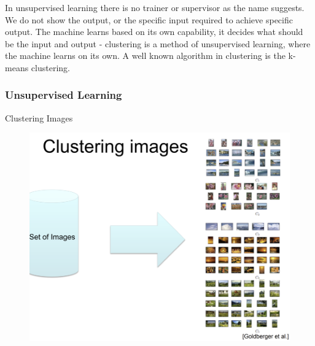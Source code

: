 \documentclass[9pt]{beamer}
\begin{document}
\begin{CJK*}{GBK}{kai}
\begin{frame}
\begin{figure}[h]
\end{figure}
In unsupervised learning there is no trainer or supervisor as the name suggests. We do not show the output, or the specific input required to achieve specific output. The machine learns based on its own capability, it decides what should be the input and output - clustering is a method of unsupervised learning, where the machine learns on its own. A well known algorithm in clustering is the k-means clustering.
\end{frame}
\begin{frame}
	\frametitle{Unsupervised Learning}
	\begin{block}{Clustering Images}	
		\begin{figure}[h]
			\centering
			\includegraphics[scale=0.3]{ClusteringImg.png}		
		\end{figure}
	\end{block}
\end{frame}


\end{CJK*}
\end{document}
